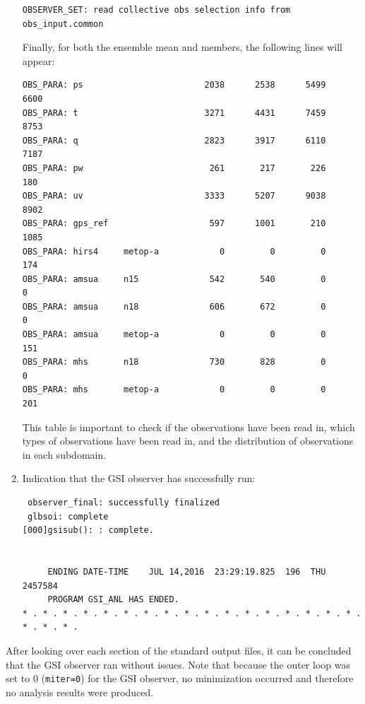 \begin{enumerate}
\begin{footnotesize}
\begin{verbatim}
OBSERVER_SET: read collective obs selection info from obs_input.common
\end{verbatim}
\end{footnotesize}


Finally, for both the ensemble mean and members, the following lines will appear:
\begin{footnotesize}
\begin{verbatim}
OBS_PARA: ps                        2038      2538      5499      6600
OBS_PARA: t                         3271      4431      7459      8753
OBS_PARA: q                         2823      3917      6110      7187
OBS_PARA: pw                         261       217       226       180
OBS_PARA: uv                        3333      5207      9038      8902
OBS_PARA: gps_ref                    597      1001       210      1085
OBS_PARA: hirs4     metop-a            0         0         0       174
OBS_PARA: amsua     n15              542       540         0         0
OBS_PARA: amsua     n18              606       672         0         0
OBS_PARA: amsua     metop-a            0         0         0       151
OBS_PARA: mhs       n18              730       828         0         0
OBS_PARA: mhs       metop-a            0         0         0       201
\end{verbatim}
\end{footnotesize}

This table is important to check if the observations have been read in, which types of observations have been read in, and the distribution of observations in each subdomain.\\

\item Indication that the GSI observer has successfully run:
\begin{footnotesize}
\begin{verbatim}
 observer_final: successfully finalized
 glbsoi: complete
[000]gsisub(): : complete.


     ENDING DATE-TIME    JUL 14,2016  23:29:19.825  196  THU   2457584
     PROGRAM GSI_ANL HAS ENDED.
* . * . * . * . * . * . * . * . * . * . * . * . * . * . * . * . * . * . * . * .
\end{verbatim}
\end{footnotesize}

\end{enumerate}

After looking over each section of the standard output files, it can be concluded that the GSI observer ran without issues. Note that because the outer loop was set to 0 (\verb|miter=0|) for the GSI observer, no minimization occurred and therefore no analysis results were produced.
   
